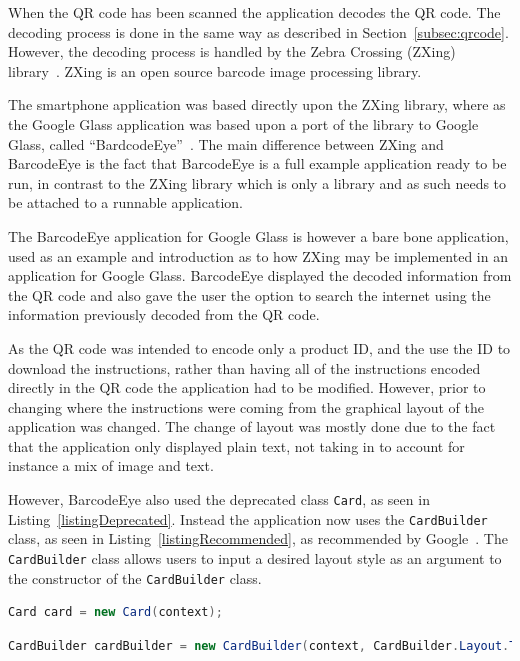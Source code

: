 When the QR code has been scanned the application decodes the QR code. The decoding process is done in the same way as described in Section~\ref{subsec:qrcode}. However, the decoding process is handled by the Zebra Crossing (ZXing) library~\cite{zxing}. ZXing is an open source barcode image processing library.

The smartphone application was based directly upon the ZXing library, where as the Google Glass application was based upon a port of the library to Google Glass, called ``BardcodeEye''~\cite{barcodeEye}. The main difference between ZXing and BarcodeEye is the fact that BarcodeEye is a full example application ready to be run, in contrast to the ZXing library which is only a library and as such needs to be attached to a runnable application.

The BarcodeEye application for Google Glass is however a bare bone application, used as an example and introduction as to how ZXing may be implemented in an application for Google Glass. BarcodeEye displayed the decoded information from the QR code and also gave the user the option to search the internet using the information previously decoded from the QR code.

As the QR code was intended to encode only a product ID, and the use the ID to download the instructions, rather than having all of the instructions encoded directly in the QR code the application had to be modified. However, prior to changing where the instructions were coming from the graphical layout of the application was changed. The change of layout was mostly done due to the fact that the application only displayed plain text, not taking in to account for instance a mix of image and text.

However, BarcodeEye also used the deprecated class \texttt{Card}, as seen in Listing~\ref{listingDeprecated}. Instead the application now uses the \texttt{CardBuilder} class, as seen in Listing~\ref{listingRecommended}, as recommended by Google~\cite{googleCard}. The \texttt{CardBuilder} class allows users to input a desired layout style as an argument to the constructor of the \texttt{CardBuilder} class.

\begin{lstlisting}[language=Java, caption={Instancing of the deprecated class Card}, label=listingDeprecated]
Card card = new Card(context);
\end{lstlisting}

\begin{lstlisting}[language=Java, caption={Instancing of the recommended class CardBuilder}, label=listingRecommended]
CardBuilder cardBuilder = new CardBuilder(context, CardBuilder.Layout.TITLE);
\end{lstlisting}

